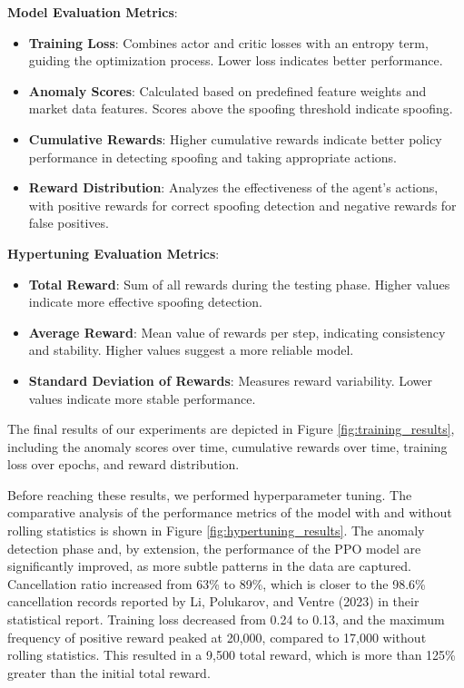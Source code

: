 \documentclass[conference]{IEEEtran}
\begin{document}
\textbf{Model Evaluation Metrics}:
    \begin{itemize}
        \item \textbf{Training Loss}: Combines actor and critic losses with an entropy term, guiding the optimization process. Lower loss indicates better performance.
        \item \textbf{Anomaly Scores}: Calculated based on predefined feature weights and market data features. Scores above the spoofing threshold indicate spoofing.
        \item \textbf{Cumulative Rewards}: Higher cumulative rewards indicate better policy performance in detecting spoofing and taking appropriate actions.
        \item \textbf{Reward Distribution}: Analyzes the effectiveness of the agent's actions, with positive rewards for correct spoofing detection and negative rewards for false positives.
    \end{itemize}

\textbf{Hypertuning Evaluation Metrics}:
    \begin{itemize}
        \item \textbf{Total Reward}: Sum of all rewards during the testing phase. Higher values indicate more effective spoofing detection.
        \item \textbf{Average Reward}: Mean value of rewards per step, indicating consistency and stability. Higher values suggest a more reliable model.
        \item \textbf{Standard Deviation of Rewards}: Measures reward variability. Lower values indicate more stable performance.
    \end{itemize}

\par The final results of our experiments are depicted in Figure \ref{fig:training_results}, including the anomaly scores over time, cumulative rewards over time, training loss over epochs, and reward distribution.

\par Before reaching these results, we performed hyperparameter tuning. The comparative analysis of the performance metrics of the model with and without rolling statistics is shown in Figure \ref{fig:hypertuning_results}. The anomaly detection phase and, by extension, the performance of the PPO model are significantly improved, as more subtle patterns in the data are captured. Cancellation ratio increased from 63\% to 89\%, which is closer to the 98.6\% cancellation records reported by Li, Polukarov, and Ventre (2023) \cite{Li_2023} in their statistical report. Training loss decreased from 0.24 to 0.13, and the maximum frequency of positive reward peaked at 20,000, compared to 17,000 without rolling statistics. This resulted in a 9,500 total reward, which is more than 125\% greater than the initial total reward.
\end{document}
